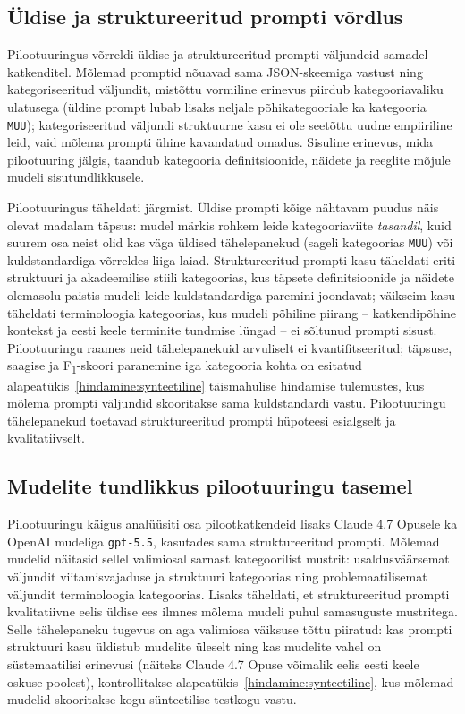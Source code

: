 \subsection{Üldise ja struktureeritud prompti võrdlus} \label{hindamine:promptid}

Pilootuuringus võrreldi üldise ja struktureeritud prompti väljundeid samadel katkenditel. Mõlemad promptid nõuavad sama JSON-skeemiga vastust ning kategoriseeritud väljundit, mistõttu vormiline erinevus piirdub kategooriavaliku ulatusega (üldine prompt lubab lisaks neljale põhikategooriale ka kategooria \texttt{MUU}); kategoriseeritud väljundi struktuurne kasu ei ole seetõttu uudne empiiriline leid, vaid mõlema prompti ühine kavandatud omadus. Sisuline erinevus, mida pilootuuring jälgis, taandub kategooria definitsioonide, näidete ja reeglite mõjule mudeli sisutundlikkusele.

Pilootuuringus täheldati järgmist. Üldise prompti kõige nähtavam puudus näis olevat madalam täpsus: mudel märkis rohkem leide kategooriaviite \emph{tasandil}, kuid suurem osa neist olid kas väga üldised tähelepanekud (sageli kategoorias \texttt{MUU}) või kuldstandardiga võrreldes liiga laiad. Struktureeritud prompti kasu täheldati eriti struktuuri ja akadeemilise stiili kategoorias, kus täpsete definitsioonide ja näidete olemasolu paistis mudeli leide kuldstandardiga paremini joondavat; väikseim kasu täheldati terminoloogia kategoorias, kus mudeli põhiline piirang -- katkendipõhine kontekst ja eesti keele terminite tundmise lüngad -- ei sõltunud prompti sisust. Pilootuuringu raames neid tähelepanekuid arvuliselt ei kvantifitseeritud; täpsuse, saagise ja F\textsubscript{1}-skoori paranemine iga kategooria kohta on esitatud alapeatükis~\ref{hindamine:synteetiline} täismahulise hindamise tulemustes, kus mõlema prompti väljundid skooritakse sama kuldstandardi vastu. Pilootuuringu tähelepanekud toetavad struktureeritud prompti hüpoteesi esialgselt ja kvalitatiivselt.

\subsection{Mudelite tundlikkus pilootuuringu tasemel} \label{hindamine:mudelid}

Pilootuuringu käigus analüüsiti osa pilootkatkendeid lisaks Claude 4.7 Opusele ka OpenAI mudeliga \texttt{gpt-5.5}, kasutades sama struktureeritud prompti. Mõlemad mudelid näitasid sellel valimiosal sarnast kategoorilist mustrit: usaldusväärsemat väljundit viitamisvajaduse ja struktuuri kategoorias ning problemaatilisemat väljundit terminoloogia kategoorias. Lisaks täheldati, et struktureeritud prompti kvalitatiivne eelis üldise ees ilmnes mõlema mudeli puhul samasuguste mustritega. Selle tähelepaneku tugevus on aga valimiosa väiksuse tõttu piiratud: kas prompti struktuuri kasu üldistub mudelite üleselt ning kas mudelite vahel on süstemaatilisi erinevusi (näiteks Claude 4.7 Opuse võimalik eelis eesti keele oskuse poolest), kontrollitakse alapeatükis~\ref{hindamine:synteetiline}, kus mõlemad mudelid skooritakse kogu sünteetilise testkogu vastu.

